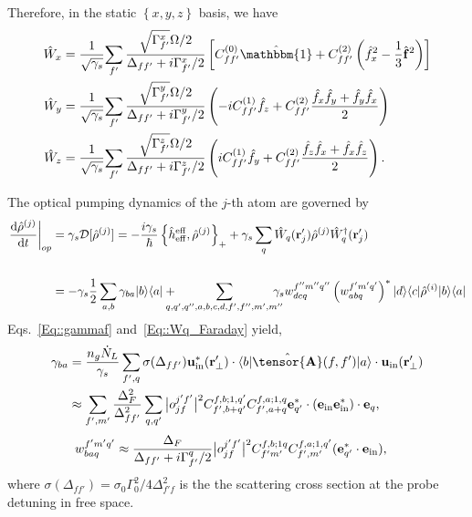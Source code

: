 \documentclass[preprint,aps,pra,onecolumn,superscriptaddress]{revtex4-1} %
\newcommand{\dt}[1]{\frac{{\mathrm d} {#1}}{{\mathrm d}t}}
\def\br{\mathbf{r}}
\def\bra#1{\langle{#1}\rvert}%
\def\ket#1{\lvert{#1}\rangle}%
\newcommand{\mbf}[1]{\mathbf{#1}}
\newcommand{\inp}{{\rm in}}
\begin{document}
\begin{appendix}
Therefore, in the static $ \left\{x,y,z \right\} $ basis, we have
\begin{align}
\hat{W}_{x} &= \frac{1}{\sqrt{\gamma_s}}\!\sum_{f'} \frac{\sqrt{\Gamma_{f'}^x}\Omega/2}{\Delta_{ff'}+i\Gamma_{f'}^x/2} \left[C_{ff'}^{(0)}\hat{\mathbbm{1}} + C_{ff'}^{(2)}\left(\hat{f}_{x}^2-\frac{1}{3}\hat{\mathbf{f}}^2 \right) \right]\\
\hat{W}_{y} &= \frac{1}{\sqrt{\gamma_s}}\!\sum_{f'} \frac{\sqrt{\Gamma_{f'}^y}\Omega/2}{\Delta_{ff'}+i\Gamma_{f'}^y/2} \left(-iC_{ff'}^{(1)}\hat{f}_z + C_{ff'}^{(2)}\frac{\hat{f}_{x}\hat{f}_{y}+\hat{f}_{y}\hat{f}_{x}}{2} \right)\\
\hat{W}_{z} &= \frac{1}{\sqrt{\gamma_s}}\!\sum_{f'} \frac{\sqrt{\Gamma_{f'}^z}\Omega/2}{\Delta_{ff'}+i\Gamma_{f'}^z/2} \left(iC_{ff'}^{(1)}\hat{f}_{y} + C_{ff'}^{(2)}\frac{\hat{f}_z\hat{f}_{x}+\hat{f}_{x}\hat{f}_z}{2}  \right).
\end{align}


The optical pumping dynamics of the $ j $-th atom are governed by 
\begin{align}
\left.\dt{\hat{\rho}^{(j)}}\right|_{op} &= \gamma_s\mathcal{D}[\hat{\rho}^{(j)}]=-\frac{i\gamma_s}{\hbar}\left\{\hat{h}^{\rm eff}_{\rm eff},\hat{\rho}^{(j)} \right\}_+ + \gamma_s\sum_{q}\hat{W}_q(\br'_j)\hat{\rho}^{(j)}\hat{W}_q^\dagger(\br'_j)\\
\\
&=-\gamma_s\frac{1}{2}\sum_{a,b}\gamma_{ba}\ket{b}\bra{a}+
\!\!\!\!\!\!\sum_{q,q',q'',a,b,c,d,f',f'',m',m''}\!\!\!\!\!\! \gamma_sw_{dcq}^{f''m''q''}\left(w_{abq}^{f'm'q'}\right)^*\ket{d}\bra{c}\hat{\rho}^{(i)}\ket{b}\bra{a}
\end{align}
Eqs.~\eqref{Eq::gammaf} and~\eqref{Eq::Wq_Faraday} yield,
\begin{subequations}
	\begin{align}
		\gamma_{ba} 
		&=\frac{n_g\dot{N}_L}{\gamma_s}  \sum_{f',q} \sigma (\Delta_{ff'} ) \mathbf{u}^*_\inp(\br'_\perp)\cdot \bra{b} \hat{\tensor{\mbf{A}}}(f,f') \ket{a}  \cdot \mathbf{u}_\inp(\br'_\perp)\\
		&\approx  \sum_{f',m'} \frac{\Delta_{F}^2}{\Delta_{ff'}^2}\sum_{q,q'} \big| o_{jf}^{j'f'} \big|^2C_{f',b+q'}^{f,b;1, q'}C_{f',a+q}^{f,a;1, q} \mathbf{e}_{q'}^* \cdot (\mathbf{e}_{\rm in}\mathbf{e}_{\rm in}^* )\cdot \mathbf{e}_q,
	\end{align}
\end{subequations}
	\begin{align}
		w_{baq}^{f'm'q'}
		&\approx  \frac{\Delta_{F}}{\Delta_{ff'}+i\Gamma_{f'}^q/2} \big| o_{jf}^{j'f'}  \big|^2 C_{f'm'}^{f,b;1 q}C_{f',m'}^{f,a;1,q'} (\mathbf{e}_{q'}^* \cdot \mathbf{e}_{\rm in}),
	\end{align}
where $ \sigma (\Delta_{ff'} )  = \sigma_0 \Gamma_0^2/4\Delta^2_{f' f}$ is the the scattering cross section at the probe detuning in free space. 


\end{appendix}
\end{document}

